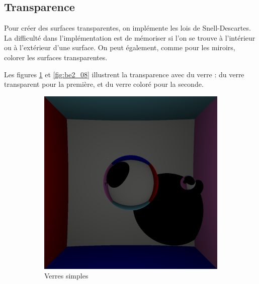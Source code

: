 \documentclass[12pt,a4paper,twoside]{report}
\begin{document}
\subsection{Transparence}

Pour créer des surfaces transparentes, on implémente les lois de Snell-Descartes. La difficulté dans l'implémentation est de mémoriser si l'on se trouve à l'intérieur ou à l'extérieur d'une surface. On peut également, comme pour les miroirs, colorer les surfaces transparentes.

Les figures \ref{fig:be2_07} et \ref{fig:be2_08} illustrent la transparence avec du verre : du verre transparent pour la première, et du verre coloré pour la seconde.

\begin{figure}[H]
	\centering
	\begin{subfigure}{.45\textwidth}
		\centering
		\includegraphics[width=1.\linewidth]{be2_07}
		\caption{Verres simples}
		\label{fig:be2_07}
	\end{subfigure}
	\begin{subfigure}{.45\textwidth}
		\centering

\end{subfigure}
\end{figure}
\end{document}
